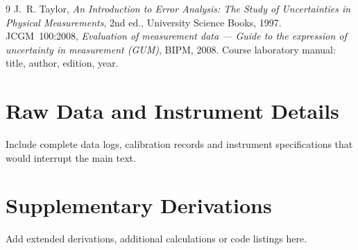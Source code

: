 \documentclass[12pt,a4paper]{article}
\newcommand{\ph}[1]{\textcolor{lpPlaceholder}{#1}}
\begin{document}
\begin{thebibliography}{9}
   J.~R. Taylor, \emph{An Introduction to Error Analysis: The Study of Uncertainties in Physical
    Measurements}, 2nd ed., University Science Books, 1997.
   JCGM~100:2008, \emph{Evaluation of measurement data --- Guide to the expression of uncertainty in
    measurement (GUM)}, BIPM, 2008.
   \ph{Course laboratory manual: title, author, edition, year.}
\end{thebibliography}

\appendix
\section{Raw Data and Instrument Details}
\ph{Include complete data logs, calibration records and instrument specifications that would interrupt the main text.}

\section{Supplementary Derivations}
\ph{Add extended derivations, additional calculations or code listings here.}
\end{document}
